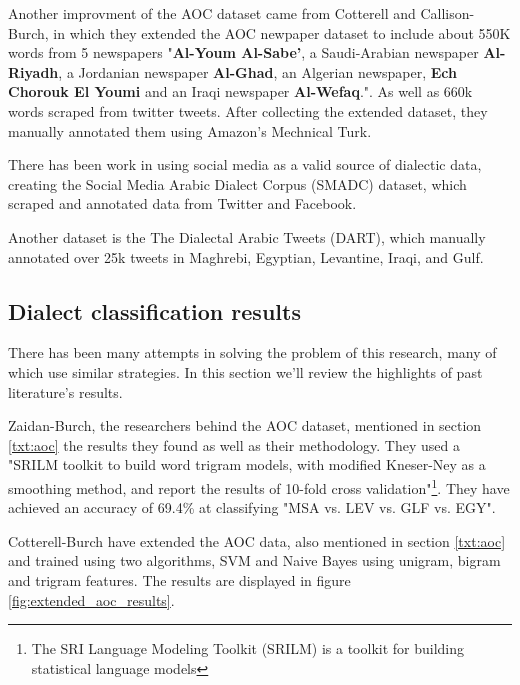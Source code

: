 \documentclass[12pt]{diazessay}
\begin{document}
    Another improvment of the AOC dataset came from Cotterell and Callison-Burch, in which they extended the AOC newpaper dataset to include about 550K words from 5 newspapers "\textbf{Al-Youm Al-Sabe’}, a Saudi-Arabian newspaper \textbf{Al-Riyadh}, a Jordanian newspaper \textbf{Al-Ghad}, an Algerian newspaper, \textbf{Ech Chorouk El Youmi} and an Iraqi newspaper \textbf{Al-Wefaq}.". As well as 660k words scraped from twitter tweets. After collecting the extended dataset, they manually annotated them using Amazon's Mechnical Turk\cite{cotterell-callison-burch-2014-multi}.
     
    There has been work in using social media as a valid source of dialectic data, creating the Social Media Arabic Dialect Corpus (SMADC) dataset, which scraped and annotated data from Twitter and Facebook\cite{alshutayri_inproceedings}.\label{txt:SMADC_talk}
    
    Another dataset is the The Dialectal Arabic Tweets (DART), which manually annotated over 25k tweets in Maghrebi, Egyptian, Levantine, Iraqi, and Gulf\cite{alsarsour-etal-2018-dart}.
     
     
    \subsection{Dialect classification results}
    There has been many attempts in solving the problem of this research, many of which use similar strategies. In this section we'll review the highlights of past literature's results.
    
    Zaidan-Burch, the researchers behind the AOC dataset, mentioned in section \ref{txt:aoc} the results they found as well as their methodology. They used a "SRILM toolkit to build word trigram models, with modified Kneser-Ney as a smoothing method, and report the results of 10-fold cross validation"\footnote{The SRI Language Modeling Toolkit (SRILM) is a toolkit for building statistical language models}. They have achieved an accuracy of 69.4\% at classifying "MSA vs. LEV vs. GLF vs. EGY"\cite{zaidan_burch}.
    
    Cotterell-Burch have extended the AOC data, also mentioned in section \ref{txt:aoc} and trained using two algorithms, SVM and Naive Bayes using unigram, bigram and trigram features\cite{cotterell-callison-burch-2014-multi}. The results are displayed in figure \ref{fig:extended_aoc_results}.
    
\end{document}
